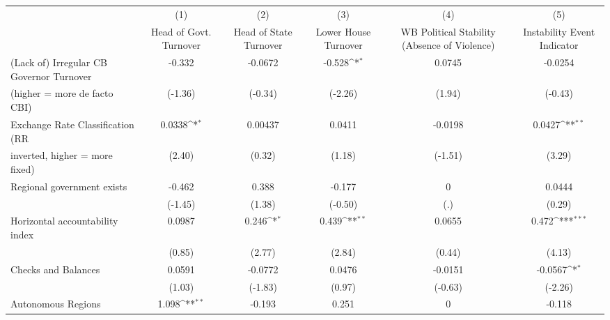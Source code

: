 {
\def\sym#1{\ifmmode^{#1}\else\(^{#1}\)\fi}
\begin{tabular}{l*{5}{c}}
\toprule
                                        &\multicolumn{1}{c}{(1)}&\multicolumn{1}{c}{(2)}&\multicolumn{1}{c}{(3)}&\multicolumn{1}{c}{(4)}&\multicolumn{1}{c}{(5)}\\
                                        &\multicolumn{1}{c}{Head of Govt. Turnover}&\multicolumn{1}{c}{Head of State Turnover}&\multicolumn{1}{c}{Lower House Turnover}&\multicolumn{1}{c}{WB Political Stability (Absence of Violence)}&\multicolumn{1}{c}{Instability Event Indicator}\\
\midrule
(Lack of) Irregular CB Governor Turnover&   -0.332         &  -0.0672         &   -0.528\sym{*}  &   0.0745         &  -0.0254         \\
(higher = more de facto CBI)            &  (-1.36)         &  (-0.34)         &  (-2.26)         &   (1.94)         &  (-0.43)         \\
\addlinespace
Exchange Rate Classification (RR        &   0.0338\sym{*}  &  0.00437         &   0.0411         &  -0.0198         &   0.0427\sym{**} \\
inverted, higher = more fixed)          &   (2.40)         &   (0.32)         &   (1.18)         &  (-1.51)         &   (3.29)         \\
\addlinespace
Regional government exists              &   -0.462         &    0.388         &   -0.177         &        0         &   0.0444         \\
                                        &  (-1.45)         &   (1.38)         &  (-0.50)         &      (.)         &   (0.29)         \\
\addlinespace
Horizontal accountability index         &   0.0987         &    0.246\sym{*}  &    0.439\sym{**} &   0.0655         &    0.472\sym{***}\\
                                        &   (0.85)         &   (2.77)         &   (2.84)         &   (0.44)         &   (4.13)         \\
\addlinespace
Checks and Balances                     &   0.0591         &  -0.0772         &   0.0476         &  -0.0151         &  -0.0567\sym{*}  \\
                                        &   (1.03)         &  (-1.83)         &   (0.97)         &  (-0.63)         &  (-2.26)         \\
\addlinespace
Autonomous Regions                      &    1.098\sym{**} &   -0.193         &    0.251         &        0         &   -0.118         \\

\end{tabular}}
